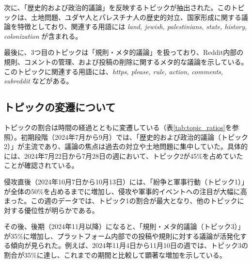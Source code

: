 \documentclass[11pt, a4j]{jreport}
\begin{document}
    次に、「歴史的および政治的議論」を反映するトピックが抽出された。このトピックは、土地問題、ユダヤ人とパレスチナ人の歴史的対立、国家形成に関する議論を特徴としており、関連する用語には \textit{land, jewish, palestinians, state, history, colonization} が含まれる。
    
    最後に、3つ目のトピックは「規則・メタ的議論」を扱っており、Reddit内部の規則、コメントの管理、および投稿の削除に関するメタ的な議論を示している。このトピックに関連する用語には、\textit{https, please, rule, action, comments, subreddit} などがある。

    \subsection{トピックの変遷について}
    トピックの割合は時間の経過とともに変遷している（表\ref{tab:topic_ratios}を参照）。初期段階（2024年7月から9月）では、「歴史的および政治的議論（トピック2）」が主流であり、議論の焦点は過去の対立や土地問題に集中していた。具体的には、2024年7月22日から7月28日の週において、トピック2が45\%を占めていたことが確認されている。
    
    侵攻直後（2024年10月7日から10月13日）には、「紛争と軍事行動（トピック1）」が全体の50\%を占めるまでに増加し、侵攻や軍事的イベントへの注目が大幅に高まった。この週のデータでは、トピック1の割合が最大となり、他のトピックに対する優位性が明らかである。
    
    その後、後期（2024年11月以降）になると、「規則・メタ的議論（トピック3）」が35\%に増加し、プラットフォーム内部での投稿や規則に対する議論が活発化する傾向が見られた。例えば、2024年11月4日から11月10日の週では、トピック3の割合が35\%に達し、これまでの期間と比較して顕著な増加を示している。

    \begin{table}[H]
    \centering
    \caption{各週におけるトピックの割合}
    \label{tab:topic_ratios}
    \end{table}    
\end{document}
